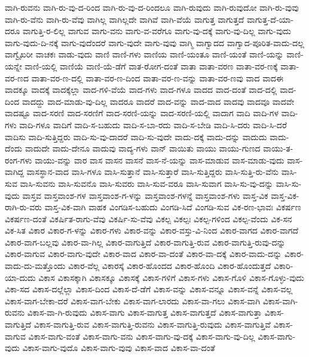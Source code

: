 {ವಾಗಿ-ರುವನು
ವಾಗಿ-ರು-ವು-ದ-ರಿಂದ
ವಾಗಿ-ರು-ವು-ದ-ರಿಂದಲೂ
ವಾಗಿ-ರುವುದು
ವಾಗಿ-ರುವುದೋ
ವಾಗಿ-ರು-ವುವು
ವಾಗಿ-ರು-ವೆನು
ವಾಗಿ-ರು-ವೆವು
ವಾಗಿಲ್ಲ
ವಾಗಿಲ್ಲದೇ
ವಾಗಿವೆ
ವಾಗಿ-ವೆಯೆ
ವಾಗುತ್ತ
ವಾಗುತ್ತದೆ
ವಾಗುತ್ತ-ದೆ-ಯಾ-ದರೂ
ವಾಗುತ್ತಿ-ರ-ಲಿಲ್ಲ
ವಾಗುವ
ವಾಗು-ವನು
ವಾಗು-ವ-ವರೆಗೂ
ವಾಗು-ವು-ದಕ್ಕೆ
ವಾಗು-ವು-ದಿಲ್ಲ
ವಾಗು-ವುದು
ವಾಗು-ವುದು-ದಿ-ನಕ್ಕೆ
ವಾಗು-ವುದೆಂದರೆ
ವಾಗು-ವುದೇ
ವಾಗು-ವುವು
ವಾಗ್ಮಿ
ವಾಗ್ವಾದದ
ವಾಗ್ವಾದ-ಪೂರಿತ-ವಾದು-ದಲ್ಲ
ವಾಗ್ವೈಖರೀ
ವಾಚಕಃ
ವಾಡು-ವುದು
ವಾಣಿ
ವಾಣಿ-ಗಳು
ವಾಣಿಯ
ವಾಣಿ-ಯಂತೂ
ವಾಣಿ-ಯಂತೆ
ವಾಣಿ-ಯನ್ನು
ವಾಣಿ-ಯನ್ನೇ
ವಾಣಿ-ಯಲ್ಲಿ
ವಾಣಿಯೆ
ವಾಣಿ-ಯೆ-ಡೆಗೆ
ವಾತ-ರೋಗ-ದಂತೆ
ವಾತಾ
ವಾತಾ-ವರಣ
ವಾತಾ-ವರ-ಣಕ್ಕೆ
ವಾತಾ-ವರ-ಣದ
ವಾತಾ-ವರ-ಣ-ದಲ್ಲಿ
ವಾತಾ-ವರ-ಣ-ದಿಂದ
ವಾತಾ-ವರ-ಣ-ವನ್ನು
ವಾತಾ-ವರ-ಣವು
ವಾದ
ವಾದಈ
ವಾದಕ್ಕೂ
ವಾದಕ್ಕೆ
ವಾದಕ್ಕೆಲ್ಲಾ
ವಾದ-ಗಳಿ-ವೆಯೆ
ವಾದ-ಗಳು
ವಾದ-ಗಳೂ
ವಾದದ
ವಾದ-ದಂತೆ
ವಾದ-ದಲ್ಲಿ
ವಾದ-ದಿಂದ
ವಾದದ್ದು
ವಾದ-ಮಾಡು-ವು-ದಿಲ್ಲ
ವಾದರೂ
ವಾದರೆ
ವಾದ-ವನ್ನು
ವಾದ-ವಾದ
ವಾದವು
ವಾದವೂ
ವಾದವೇ
ವಾದಷ್ಟೂ
ವಾದ-ಸರಣಿ
ವಾದ-ಸರಣಿಗೆ
ವಾದ-ಸರಣಿ-ಯನ್ನು
ವಾದ-ಸರಣಿ-ಯಲ್ಲಿ
ವಾದಾಗ
ವಾದಿ
ವಾದಿ-ಗಳ
ವಾದಿ-ಗಳು
ವಾದಿ-ಗಳೂ
ವಾದಿಗೆ
ವಾದಿ-ಸ-ಬಹುದು
ವಾದಿ-ಸ-ಬಾ-ರದು
ವಾದಿ-ಸ-ಬೇಡಿ
ವಾದಿ-ಸಿ-ದರು
ವಾದಿ-ಸಿ-ದರೆ
ವಾದಿಸು
ವಾದಿ-ಸುತ್ತಿದ್ದರು
ವಾದಿ-ಸು-ವು-ದಾದರೆ
ವಾದಿ-ಸು-ವುದೇ
ವಾದು-ದಕ್ಕೆ
ವಾದು-ದನ್ನು
ವಾದುದು
ವಾದು-ದೆಂದು
ವಾದುದೇ
ವಾದು-ದೇನೂ
ವಾದುವು
ವಾದ್ಯ-ಗಳು
ವಾನ್
ವಾಯಿತು
ವಾಯು
ವಾಯು-ಗುಣದ
ವಾಯು-ತ-ರಂಗ-ಗಳು
ವಾಯು-ವನ್ನು
ವಾರ
ವಾಸ
ವಾಸನ
ವಾಸನೆ
ವಾಸ-ನೆ-ಯನ್ನು
ವಾಸ-ಮಾಡುವ
ವಾಸ-ಮಾಡು-ವುದು
ವಾಸ-ವಾಗಿದ್ದ
ವಾಸಸ್ಥಾನ-ವಾದ
ವಾಸಿ-ಗಳೂ
ವಾಸಿ-ಸುತ್ತಾನೆ
ವಾಸಿ-ಸುತ್ತಾರೆ
ವಾಸಿ-ಸುತ್ತಿದ್ದರು
ವಾಸಿ-ಸುತ್ತಿ-ರು-ವೆನು
ವಾಸಿ-ಸುವ
ವಾಸಿ-ಸುವನು
ವಾಸಿ-ಸುವನೊ
ವಾಸಿ-ಸುವರು
ವಾಸಿ-ಸುವ-ವರೂ
ವಾಸಿ-ಸುವಾಗ
ವಾಸಿ-ಸು-ವು-ದನ್ನು
ವಾಸಿ-ಸು-ವುದು
ವಾಸ್ತವ
ವಾಸ್ತವಾಂಶ-ಗಳ
ವಾಸ್ತವಾಂಶ-ಗ-ಳನ್ನು
ವಾಸ್ತವಾಂಶ-ಗಳನ್ನೆ
ವಾಸ್ತವಾಂಶ-ಗಳು
ವಾಸ್ತ-ವಿಕ
ವಾಸ್ತ-ವಿಕ-ರಾಗಿ-ರು-ವರು
ವಾಸ್ತ-ವಿಕ-ವಾಗಿ
ವಾಹಕ
ವಿಂಗಡಿಸ-ಬಹುದು
ವಿಂಗಡಿ-ಸಿದೆ
ವಿಂಗಡಿ-ಸುವ
ವಿಕ-ರಣ-ಭಾವಃ
ವಿಕರ್ಷಣ
ವಿಕರ್ಷಣ-ದಂತೆ
ವಿಕರ್ಷಿತ-ರಾಗು-ವೆವು
ವಿಕರ್ಷಿ-ಸು-ವೆವು
ವಿಕಲ್ಪ
ವಿಕಲ್ಪಃ
ವಿಕಲ್ಪ-ಗಳಿಂದ
ವಿಕಲ್ಪ-ವೆಂದು
ವಿಕ-ಸನ
ವಿಕ-ಸಿತ
ವಿಕಾರ
ವಿಕಾರ-ಗ-ಳನ್ನು
ವಿಕಾರ-ಗಳು
ವಿಕಾರ-ವನ್ನು
ವಿಕಾರ-ವಸ್ತು-ವಿ-ನಿಂದ
ವಿಕಾರ-ವಾಗದ
ವಿಕಾರ-ವಾಗದೆ
ವಿಕಾರ-ವಾಗ-ಬಲ್ಲವು
ವಿಕಾರ-ವಾ-ಗಿಲ್ಲ
ವಿಕಾರ-ವಾಗುತ್ತಿದೆ
ವಿಕಾರ-ವಾಗುತ್ತಿ-ರುವ
ವಿಕಾರ-ವಾಗುತ್ತಿ-ರುವು-ದನ್ನು
ವಿಕಾರ-ವಾಗುವ
ವಿಕಾರ-ವಾಗು-ವುದೇ
ವಿಕಾರ-ವಾದ
ವಿಕಾರ-ವಾ-ದಂತೆ
ವಿಕಾರ-ವಾ-ದಕ್ಕೆ
ವಿಕಾರ-ವಾದು-ದನ್ನು
ವಿಕಾರ-ವಾದು-ದು-ಮತ್ತೊಂದು
ವಿಕಾರ-ವೆಲ್ಲ
ವಿಕಾರಸ್ಕೆ
ವಿಕಾರ-ಹೊಂದದ
ವಿಕಾರ-ಹೊಂದಿ
ವಿಕಾರ-ಹೊಂದುತ್ತದೆ
ವಿಕಾರಿ-ಯಾ-ದುದು
ವಿಕಾಸ
ವಿಕಾಸಕ್ಕಾಗಿ
ವಿಕಾಸಕ್ಕೂ
ವಿಕಾಸಕ್ಕೆ
ವಿಕಾಸ-ಗಳಿಗೆ
ವಿಕಾಸ-ಗಳು
ವಿಕಾಸ-ಗೊಳಿ
ವಿಕಾಸ-ಗೊಳ್ಳು-ವುದು
ವಿಕಾ-ಸದ
ವಿಕಾಸ-ದಲ್ಲೆಲ್ಲಾ
ವಿಕಾಸ-ದಿಂದ
ವಿಕಾಸ-ದೆ-ಡೆಗೆ
ವಿಕಾಸ-ವನ್ನು
ವಿಕಾಸ-ವನ್ನೂ
ವಿಕಾಸ-ವನ್ನೆ
ವಿಕಾಸ-ವಲ್ಲ
ವಿಕಾಸ-ವಾಗ-ಬೇಕಾ-ದರೆ
ವಿಕಾಸ-ವಾಗ-ಬೇಕು
ವಿಕಾಸ-ವಾಗ-ಲಾರದು
ವಿಕಾಸ-ವಾ-ಗಲು
ವಿಕಾಸ-ವಾಗಿ
ವಿಕಾಸ-ವಾಗಿ-ರುವನು
ವಿಕಾಸ-ವಾ-ಗಿ-ರುವುದು
ವಿಕಾಸ-ವಾಗು
ವಿಕಾಸ-ವಾಗುತ್ತ
ವಿಕಾಸ-ವಾಗುತ್ತದೆ
ವಿಕಾಸ-ವಾಗುತ್ತಾ
ವಿಕಾಸ-ವಾಗುತ್ತಿದೆ
ವಿಕಾಸ-ವಾಗುತ್ತಿ-ರುವ
ವಿಕಾಸ-ವಾಗುತ್ತಿ-ರುವನು
ವಿಕಾಸ-ವಾಗುತ್ತಿ-ರುವುದು
ವಿಕಾಸ-ವಾಗುತ್ತಿವೆ
ವಿಕಾಸ-ವಾಗುವ
ವಿಕಾಸ-ವಾಗು-ವಂತೆ
ವಿಕಾಸ-ವಾಗು-ವನು
ವಿಕಾಸ-ವಾಗು-ವು-ದಕ್ಕೆ
ವಿಕಾಸ-ವಾಗು-ವು-ದಿಲ್ಲ
ವಿಕಾಸ-ವಾಗು-ವುದು
ವಿಕಾಸ-ವಾಗು-ವುದೊ
ವಿಕಾಸ-ವಾಗು-ವುವು
ವಿಕಾಸ-ವಾದ
ವಿಕಾಸ-ವಾ-ದಂತೆ
}
